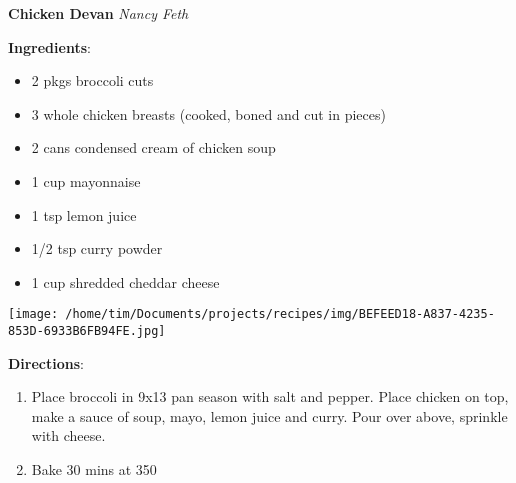 \documentclass[11pt, twoside, openany]{book}
\begin{document}
\noindent\begin{minipage}[t]{\linewidth}%
{\Large\textbf{Chicken Devan}} \label{chicken-devan}\hfill\textit{Nancy Feth}\\
\noindent\begin{minipage}[t]{0.78\linewidth}%
\textbf{Ingredients}:\vspace{-3mm}
\begin{multicols}{2}
\begin{itemize}\setlength\itemsep{-1mm}
\item 2 pkgs broccoli cuts
\item 3 whole chicken breasts (cooked, boned and cut in pieces)
\item 2 cans condensed cream of chicken soup
\item 1 cup mayonnaise
\item 1 tsp lemon juice
\item 1/2 tsp curry powder
\item 1 cup shredded cheddar cheese
\end{itemize}
\end{multicols}
\end{minipage}
\noindent\begin{minipage}[t]{0.18\linewidth}
\centering \strut\vspace*{-\baselineskip}\newline
\texttt{[image: /home/tim/Documents/projects/recipes/img/BEFEED18-A837-4235-853D-6933B6FB94FE.jpg]}\\
\end{minipage}\vspace{3mm}
\textbf{Directions}:
\vspace{-3mm}\begin{enumerate}\setlength\itemsep{-1mm}
\item Place broccoli in 9x13 pan season with salt and pepper. Place chicken on top, make a sauce of soup, mayo, lemon juice and curry. Pour over above, sprinkle with cheese.
\item Bake 30 mins at 350
\end{enumerate}
\end{minipage}\vspace{8mm}
\end{document}
